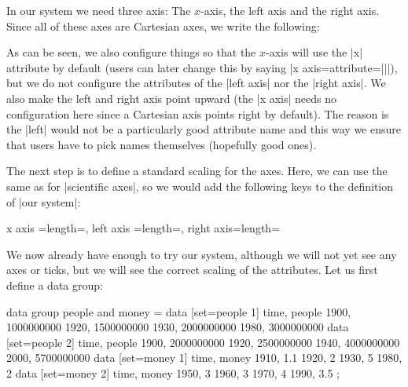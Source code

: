 In our system we need three axis: The $x$-axis, the left axis and the right
axis. Since all of these axes are Cartesian axes, we write the following:
%
\begin{codeexample}
\end{codeexample}
%
As can be seen, we also configure things so that the $x$-axis will use the |x|
attribute by default (users can later change this by saying
|x axis={attribute=||}|), but we do not configure
the attributes of the |left axis| nor the |right axis|. We also make the left
and right axis point upward (the |x axis| needs no configuration here since a
Cartesian axis points right by default). The reason is the |left| would not be
a particularly good attribute name and this way we ensure that users have to
pick names themselves (hopefully good ones).

The next step is to define a standard scaling for the axes. Here, we can use
the same as for |scientific axes|, so we would add the following keys to the
definition of |our system|:
%
\begin{codeexample}
x axis    ={length=},
left axis ={length=},
right axis={length=}
\end{codeexample}

We now already have enough to try our system, although we will not yet see any
axes or ticks, but we will see the correct scaling of the attributes. Let us
first define a data group:
%
\begin{codeexample}
\tikz \datavisualization data group {people and money} = {
    data [set=people 1] {
      time, people
      1900, 1000000000
      1920, 1500000000
      1930, 2000000000
      1980, 3000000000
    }
    data [set=people 2] {
      time, people
      1900, 2000000000
      1920, 2500000000
      1940, 4000000000
      2000, 5700000000
    }
    data [set=money 1] {
      time, money
      1910, 1.1
      1920, 2
      1930, 5
      1980, 2
    }
    data [set=money 2] {
      time, money
      1950, 3
      1960, 3
      1970, 4
      1990, 3.5
    }
  };
\end{codeexample}

